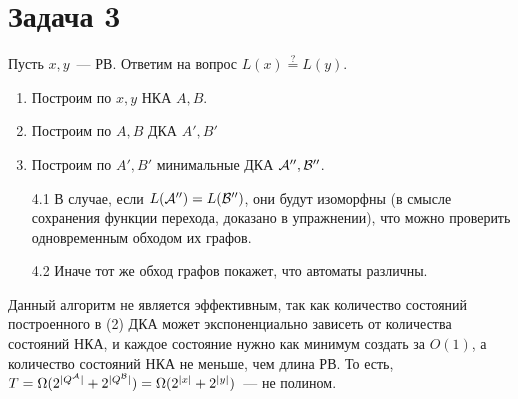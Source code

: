 \documentclass[a4paper]{article}
\def\A{{\cal A}}
\def\B{{\cal B}}
\begin{document}
\section*{Задача 3}
Пусть $x,y$~--- РВ. Ответим на вопрос $L(x)\overset{?}{=}L(y)$.
\begin{enumerate}
\item Построим по $x,y$ НКА $A,B$.
\item Построим по $A,B$ ДКА $A',B'$
\item Построим по $A',B'$ минимальные ДКА $\A'',\B''$. 
\item [4.1] В случае, если $L(\A'')=L(\B'')$, они будут изоморфны (в смысле сохранения функции перехода, доказано в упражнении), что можно проверить одновременным обходом их графов.
\item [4.2] Иначе тот же обход графов покажет, что автоматы различны.
\end{enumerate}
Данный алгоритм не является эффективным, так как количество состояний построенного в (2) ДКА может экспоненциально зависеть от количества состояний НКА, и каждое состояние нужно как минимум создать за $O(1)$, а количество состояний НКА не меньше, чем длина РВ. То есть, $T=\Omega(2^{|Q^\A|}+2^{|Q^\B|})=\Omega(2^{|x|}+2^{|y|})$~--- не полином.
\end{document}
